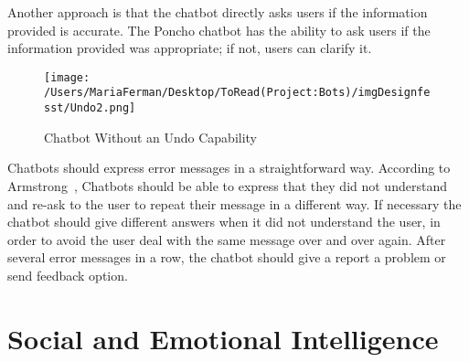 \documentclass[a4paper,10pt]{article}
\begin{document}
Another approach is that the chatbot directly asks users if the information provided is accurate. The Poncho chatbot has the ability to ask users if the information provided was appropriate; if not, users can clarify it.  

\begin{figure}
\centering
\texttt{[image: /Users/MariaFerman/Desktop/ToRead(Project:Bots)/imgDesignfesst/Undo2.png]}
\caption{Chatbot Without an Undo Capability}
\label{FigureUndo}
\end{figure}


Chatbots should express error messages in a straightforward way. According to Armstrong~\cite{HelpingYourBabyBotLearnToChat}, Chatbots should be able to express that they did not understand and re-ask to the user to repeat their message in a different way. If necessary the chatbot should give different answers when it did not understand the user, in order to avoid the user deal with the same message over and over again. After several error messages in a row, the chatbot should give a report a problem or send feedback option. 


\section{Social and Emotional Intelligence}
\end{document}
